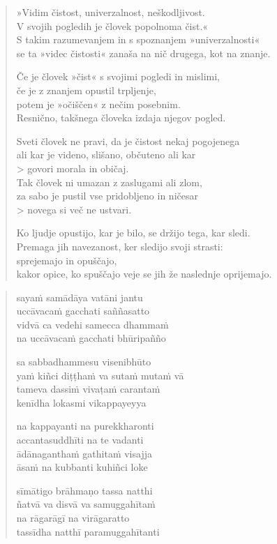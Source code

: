 \begin{verse}


»Vidim čistost, univerzalnost, neškodljivost.\\
V svojih pogledih je človek popolnoma čist.«\\
S takim razumevanjem in s spoznanjem »univerzalnosti«\\
se ta »videc čistosti« zanaša na nič drugega, kot na znanje.

Če je človek »čist« s svojimi pogledi in mislimi,\\
če je z znanjem opustil trpljenje,\\
potem je »očiščen« z nečim posebnim.\\
Resnično, takšnega človeka izdaja njegov pogled.

Sveti človek ne pravi, da je čistost nekaj pogojenega\\
ali kar je videno, slišano, občuteno ali kar\\> govori morala in običaj.\\
Tak človek ni umazan z zaslugami ali zlom,\\
za sabo je pustil vse pridobljeno in ničesar\\> novega si več ne ustvari.

Ko ljudje opustijo, kar je bilo, se držijo tega, kar sledi.\\
Premaga jih navezanost, ker sledijo svoji strasti:\\
sprejemajo in opuščajo,\\
kakor opice, ko spuščajo veje se jih že naslednje oprijemajo.

\end{verse}


\clearpage
\begin{verse}

sayaṁ samādāya vatāni jantu\\
uccāvacaṁ gacchati saññasatto\\
vidvā ca vedehi samecca dhammaṁ\\
na uccāvacaṁ gacchati bhūripañño

sa sabbadhammesu visenibhūto\\
yaṁ kiñci diṭṭhaṁ va sutaṁ mutaṁ vā\\
tameva dassiṁ vivaṭaṁ carantaṁ\\
kenīdha lokasmi vikappayeyya

na kappayanti na purekkharonti\\
accantasuddhīti na te vadanti\\
ādānaganthaṁ gathitaṁ visajja\\
āsaṁ na kubbanti kuhiñci loke

sīmātigo brāhmaṇo tassa natthi\\
ñatvā va disvā va samuggahītaṁ\\
na rāgarāgī na virāgaratto\\
tassīdha natthī paramuggahītanti

\end{verse}

